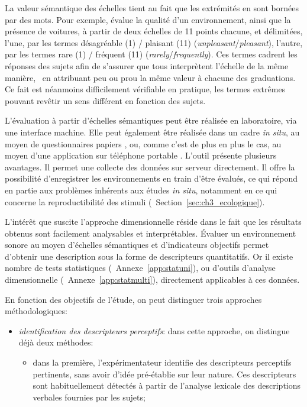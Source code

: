 {La valeur sémantique des échelles tient au fait que les extrémités en sont bornées par des mots. Pour exemple, \citep{ricciardi2015sound} évalue la qualité d'un environnement, ainsi que la présence de voitures, à partir de deux échelles de 11 points chacune, et délimitées, l'une, par les termes désagréable (1) / plaisant (11) (\emph{unpleasant}/\emph{pleasant}), l'autre, par les termes rare (1) / fréquent (11) (\emph{rarely}/\emph{frequently}). Ces termes cadrent les réponses des sujets afin de s'assurer que tous interprètent l'échelle de la même manière, \ie~en attribuant peu ou prou la même valeur à chacune des graduations. Ce fait est néanmoins difficilement vérifiable en pratique, les termes extrêmes pouvant revêtir un sens différent en fonction des sujets.

L'évaluation à partir d'échelles sémantiques peut être réalisée en laboratoire, via une interface machine. Elle peut également être réalisée dans un cadre \emph{in situ}, au moyen de questionnaires papiers \citep{jeon2013soundwalk,torija2013application}, ou, comme c'est de plus en plus le cas, au moyen d'une application sur téléphone portable \citep{kardous2014evaluation,ricciardi2015sound}. L'outil présente plusieurs avantages. Il permet une collecte des données sur serveur directement. Il offre la possibilité d'enregistrer les environnements en train d'être évalués, ce qui répond en partie aux problèmes inhérents aux études \emph{in situ}, notamment en ce qui concerne la reproductibilité des stimuli (\cf~Section~\ref{sec:ch3_ecologique}).

L'intérêt que suscite l'approche dimensionnelle réside dans le fait que les résultats obtenus sont facilement analysables et interprétables. Évaluer un environnement sonore au moyen d'échelles sémantiques et d'indicateurs objectifs permet d'obtenir une description sous la forme de descripteurs quantitatifs. Or il existe nombre de tests statistiques (\cf~Annexe~\ref{app:statuni}), ou d'outils d'analyse dimensionnelle (\cf~Annexe~\ref{app:statmulti}), directement applicables à ces données.

En fonction des objectifs de l'étude, on peut distinguer trois approches méthodologiques:

\begin{itemize}

\item \emph{identification des descripteurs perceptifs}: dans cette approche, on distingue déjà deux méthodes:

\begin{itemize}
\item dans la première, l'expérimentateur identifie des descripteurs perceptifs pertinents, sans avoir d'idée pré-établie sur leur nature. Ces descripteurs sont habituellement détectés à partir de l'analyse lexicale des descriptions verbales fournies par les sujets;


\end{itemize}
\end{itemize}}
